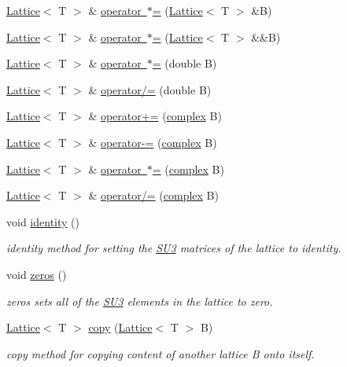 \begin{DoxyCompactItemize}
\mbox{\hyperlink{class_lattice}{Lattice}}$<$ T $>$ \& \mbox{\hyperlink{class_lattice_a123a54c46163261b0332ff10c1f79f80}{operator $\ast$=}} (\mbox{\hyperlink{class_lattice}{Lattice}}$<$ T $>$ \&B)
\item 
\mbox{\hyperlink{class_lattice}{Lattice}}$<$ T $>$ \& \mbox{\hyperlink{class_lattice_a610be724a235b1de20babde84dcd16dd}{operator $\ast$=}} (\mbox{\hyperlink{class_lattice}{Lattice}}$<$ T $>$ \&\&B)
\item 
\mbox{\hyperlink{class_lattice}{Lattice}}$<$ T $>$ \& \mbox{\hyperlink{class_lattice_a1d7db986711ac8ff3a26e8d865d66a89}{operator $\ast$=}} (double B)
\item 
\mbox{\hyperlink{class_lattice}{Lattice}}$<$ T $>$ \& \mbox{\hyperlink{class_lattice_aafe786fd40986031094f2d76ca28640b}{operator/=}} (double B)
\item 
\mbox{\hyperlink{class_lattice}{Lattice}}$<$ T $>$ \& \mbox{\hyperlink{class_lattice_ab94a46cade378e4daa689e2ddcf61ff3}{operator+=}} (\mbox{\hyperlink{classcomplex}{complex}} B)
\item 
\mbox{\hyperlink{class_lattice}{Lattice}}$<$ T $>$ \& \mbox{\hyperlink{class_lattice_a848d049b47fe69fc99fd54d8a39b544f}{operator-\/=}} (\mbox{\hyperlink{classcomplex}{complex}} B)
\item 
\mbox{\hyperlink{class_lattice}{Lattice}}$<$ T $>$ \& \mbox{\hyperlink{class_lattice_ae4405517258f14d94479ad6f2c2f4343}{operator $\ast$=}} (\mbox{\hyperlink{classcomplex}{complex}} B)
\item 
\mbox{\hyperlink{class_lattice}{Lattice}}$<$ T $>$ \& \mbox{\hyperlink{class_lattice_afa9568877b23d2266c7d2f29fe0ec6ad}{operator/=}} (\mbox{\hyperlink{classcomplex}{complex}} B)
\item 
void \mbox{\hyperlink{class_lattice_a5ad6bf603b4b455f0368362aeeddb748}{identity}} ()
\begin{DoxyCompactList}\small\item\em identity method for setting the \mbox{\hyperlink{class_s_u3}{S\+U3}} matrices of the lattice to identity. \end{DoxyCompactList}\item 
void \mbox{\hyperlink{class_lattice_a1e8bfb54f85e78f2c97e8b90d2b47dc9}{zeros}} ()
\begin{DoxyCompactList}\small\item\em zeros sets all of the \mbox{\hyperlink{class_s_u3}{S\+U3}} elements in the lattice to zero. \end{DoxyCompactList}\item 
\mbox{\hyperlink{class_lattice}{Lattice}}$<$ T $>$ \mbox{\hyperlink{class_lattice_a85154fbd1b0ae42af329135c6cd11f34}{copy}} (\mbox{\hyperlink{class_lattice}{Lattice}}$<$ T $>$ B)
\begin{DoxyCompactList}\small\item\em copy method for copying content of another lattice B onto itself. \end{DoxyCompactList}\end{DoxyCompactItemize}
